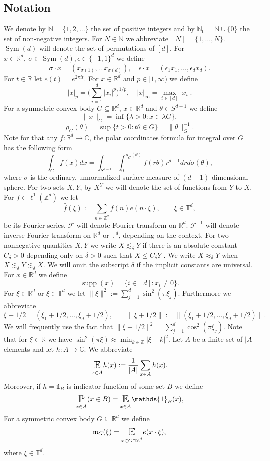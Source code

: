 \documentclass[10pt,a4paper]{amsart}
\numberwithin{equation}{section}
\newcommand{\E}{\mathop{\mathbb{E}}}
\newcommand{\Pro}{\mathop{\mathbb{P}}}
\newcommand{\Z}{\mathbb{Z}}
\newcommand{\R}{\mathbb{R}}
\newcommand{\C}{\mathbb{C}}
\newcommand{\N}{\mathbb{N}}
\newcommand{\T}{\mathbb{T}}
\DeclareMathOperator{\Sym}{Sym}
\DeclareMathOperator{\supp}{supp}
\newcommand{\se}[1]{\underset{_{\substack{#1}}}{\mathlarger{\mathlarger{\E}}}}
\newcommand{\spr}[1]{\underset{_{\substack{#1}}}{\mathlarger{\mathlarger{\Pro}}}}
\begin{document}
\subsection{Notation}
 We denote by $\N= \{1,2,... \}$ the set of positive integers and by $\N_0=\N \cup \{ 0\}$ the set of non-negative integers.
 For $N\in \N$ we abbreviate $[N]=\{1,\dots,N\}.$
$\Sym(d)$ will denote the set of permutations of $[d]$. For $x \in \R^d, \ \sigma \in \Sym(d), \epsilon \in \{-1,1\}^d$ we define 
\[
\sigma \cdot x= (x_{\sigma(1)}, \ldots x_{\sigma(d)}), \quad \epsilon \cdot x= (\epsilon_1 x_1, \ldots, \epsilon_d x_d).
\]
For $t \in \R$ let $e(t)=e^{2\pi i t}$.
For $x \in \R^d$ and $p \in [1,\infty)$ we define
\[
|x|_p= \Big(\sum_{i=1}^d |x_i|^p \Big)^{1/p}, \quad |x|_{\infty}=\max_{i \in [d]} |x_i|.
\]
 For a symmetric convex body $G \subseteq \R^d$, $x \in \R^d$ and $\theta \in S^{d-1}$ we define 
\[
\| x\|_G= \inf\Big\{ \lambda>0 : x \in \lambda G \Big\},
\]
\[
\rho_G(\theta)= \sup\Big\{t>0: t \theta \in G \Big\}=\|\theta\|_G^{-1}.
\]
Note for that any $f: \R^d \to \C$, the polar coordinates formula for integral over $G$ has the following form
\[
\int_{G} f(x) dx= \int_{S^{d-1}} \int_0^{\rho_G(\theta)} f(r \theta) r^{d-1} dr d\sigma(\theta),
\]
where $\sigma$ is the ordinary, unnormalized surface measure of $(d-1)$-dimensional sphere.
 For two sets $X,Y$, by $X^Y$ we will denote the set of functions from $Y$ to $X$.
 For $f\in \ell^1(\Z^d)$ we let 
\begin{equation*}
 \hat{f}(\xi) := \sum_{n\in\Z^d} f(n) e(n\cdot \xi),\qquad \xi\in\T^d,
\end{equation*}
be its Fourier series. $\mathcal{F}$ will denote Fourier transform on $\R^d$. $\mathcal{F}^{-1}$ will denote inverse Fourier transform on $\R^d$ or $\T^d$, depending on the context. 
 For two nonnegative quantities $X, Y$
we write $X \lesssim_{\delta} Y$ if there is an absolute constant
$C_{\delta}>0$ depending only on $\delta>0$ such that $X\le C_{\delta}Y$ .
We  write $X \approx_{\delta} Y$ when
$X \lesssim_{\delta} Y\lesssim_{\delta} X$. We will omit the subscript
$\delta$ if the implicit constants are universal.
For $x \in \mathbb{R}^d$ we define
\[
\supp(x)=\{i \in [d]: x_i \neq 0\}.
\]
For $\xi\in \R^d$ or $\xi \in \T^d$ we let $\| \xi \|^2:=\sum_{j=1}^d \sin^2(\pi \xi_j).$ Furthermore we abbreviate \[\xi+1/2=(\xi_1+1/2,\ldots,\xi_d+1/2),\qquad \|\xi +1/2 \|:=\|(\xi_1+1/2,\ldots,\xi_d+1/2)\|.\] We will frequently use the fact that
$\|\xi +1/2 \|^2= \sum_{j=1}^d \cos^2(\pi \xi_j)$. Note that for $\xi \in \R$ we have $\sin^2(\pi \xi) \approx \min_{k \in \Z} |\xi-k|^2$.
 Let $A$ be a finite set of $|A|$ elements and let $h\colon A\to \mathbb{C}.$ We abbreviate \[\se{x \in A}h(x):=\frac{1}{|A|}\sum_{x\in A} h(x).\]
 Moreover, if $h=\mathds{1}_B$ is indicator function of some set $B$ we define
 \[
 \spr{x \in A}(x \in B)= \se{x \in A}\mathds{1}_B(x),
 \]
 For a symmetric convex body $G \subseteq \R^d$ we define
\[
\mathfrak{m}_G(\xi)= \se{x \in G \cap \Z^d} e(x \cdot \xi),
\]
where $\xi \in \T^d$.
\end{document}
